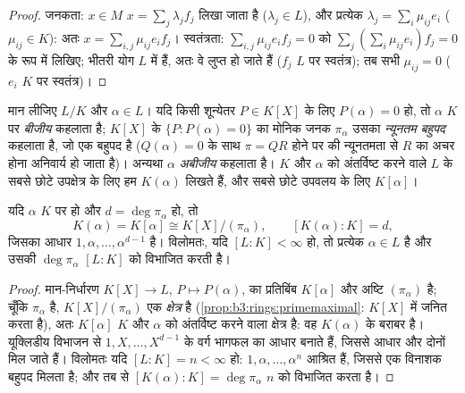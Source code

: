 \begin{proof}
जनकता: $x \in M$ $x = \sum_j \lambda_jf_j$ लिखा जाता है ($\lambda_j \in L$), और प्रत्येक $\lambda_j = \sum_i \mu_{ij}e_i$ ($\mu_{ij} \in K$):
अतः $x = \sum_{i,j}\mu_{ij}e_if_j$। स्वतंत्रता: $\sum_{i,j}\mu_{ij}e_if_j = 0$ को $\sum_j (\sum_i
\mu_{ij}e_i)f_j = 0$ के रूप में लिखिए; भीतरी योग
$L$ में हैं, अतः वे लुप्त हो जाते हैं ($f_j$ $L$ पर स्वतंत्र);
तब सभी $\mu_{ij} = 0$ ($e_i$ $K$ पर स्वतंत्र)।
\end{proof}

\begin{definition}\label{def:b3:galois:algebraic}
मान लीजिए $L/K$ और $\alpha \in L$। यदि किसी शून्येतर $P \in K[X]$ के लिए $P(\alpha) = 0$ हो,
तो $\alpha$ $K$ पर \emph{बीजीय} कहलाता है; $K[X]$
के  $\{P : P(\alpha) = 0\}$ का मोनिक जनक $\pi_\alpha$ उसका \emph{न्यूनतम
बहुपद} कहलाता है, जो एक
 बहुपद है ($Q(\alpha) = 0$ के साथ $\pi = QR$ होने पर  की न्यूनतमता से
$R$ का अचर होना अनिवार्य हो जाता है)। अन्यथा $\alpha$
\emph{अबीजीय} कहलाता है। $K$ और $\alpha$ को अंतर्विष्ट करने वाले
$L$ के सबसे छोटे उपक्षेत्र के लिए हम $K(\alpha)$ लिखते हैं, और सबसे
छोटे उपवलय के लिए $K[\alpha]$।
\end{definition}

\begin{theorem}\label{thm:b3:galois:simple}
यदि $\alpha$ $K$ पर  हो और $d = \deg\pi_\alpha$ हो, तो
\[
K(\alpha) = K[\alpha] \cong K[X]/(\pi_\alpha),
\qquad [K(\alpha) : K] = d,
\]
जिसका आधार $1, \alpha, \dots, \alpha^{d-1}$ है। विलोमतः, यदि $[L:K] < \infty$ हो, तो प्रत्येक $\alpha \in L$
 है और उसकी  $\deg \pi_\alpha$ $[L:K]$ को विभाजित करती है।
\end{theorem}

\begin{proof}
मान-निर्धारण $K[X] \to L$, $P \mapsto P(\alpha)$, का प्रतिबिंब $K[\alpha]$ और अष्टि $(\pi_\alpha)$ है;
चूँकि $\pi_\alpha$  है, $K[X]/(\pi_\alpha)$ एक \emph{क्षेत्र} है (\cref{prop:b3:rings:primemaximal}: 
$K[X]$ में   जनित करता है), अतः $K[\alpha]$ $K$
और $\alpha$ को अंतर्विष्ट करने वाला क्षेत्र है: वह $K(\alpha)$ के बराबर है।
यूक्लिडीय विभाजन से $1, X, \dots, X^{d-1}$ के वर्ग भागफल का आधार बनाते हैं, जिससे
आधार और  दोनों मिल जाते हैं। विलोमतः यदि $[L:K]
= n < \infty$ हो: $1, \alpha, \dots, \alpha^n$ आश्रित
हैं, जिससे एक विनाशक बहुपद मिलता है; और तब  से $[K(\alpha):K] =
\deg\pi_\alpha$
$n$ को विभाजित करता है।
\end{proof}

